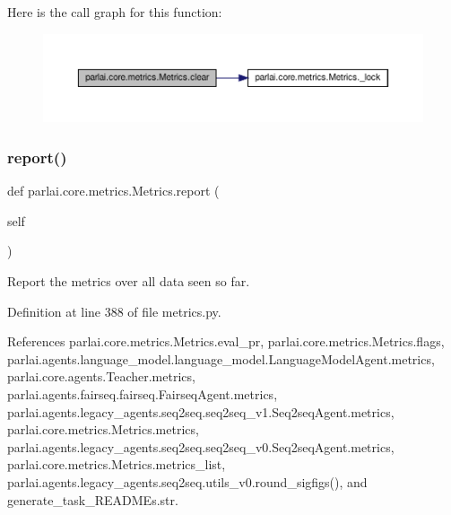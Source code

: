 Here is the call graph for this function\+:
\nopagebreak
\begin{figure}[H]
\begin{center}
\leavevmode
\includegraphics[width=350pt]{classparlai_1_1core_1_1metrics_1_1Metrics_a72759455e9d5ebab2775aed1fa7f952a_cgraph}
\end{center}
\end{figure}
\mbox{\label{classparlai_1_1core_1_1metrics_1_1Metrics_ae96ffa8a0a1044cdcfcf6cf15fa139ee}} 
\subsubsection{\texorpdfstring{report()}{report()}}
{\footnotesize\ttfamily def parlai.\+core.\+metrics.\+Metrics.\+report (\begin{DoxyParamCaption}\item[{}]{self }\end{DoxyParamCaption})}

\begin{DoxyVerb}Report the metrics over all data seen so far.\end{DoxyVerb}
 

Definition at line 388 of file metrics.\+py.



References parlai.\+core.\+metrics.\+Metrics.\+eval\+\_\+pr, parlai.\+core.\+metrics.\+Metrics.\+flags, parlai.\+agents.\+language\+\_\+model.\+language\+\_\+model.\+Language\+Model\+Agent.\+metrics, parlai.\+core.\+agents.\+Teacher.\+metrics, parlai.\+agents.\+fairseq.\+fairseq.\+Fairseq\+Agent.\+metrics, parlai.\+agents.\+legacy\+\_\+agents.\+seq2seq.\+seq2seq\+\_\+v1.\+Seq2seq\+Agent.\+metrics, parlai.\+core.\+metrics.\+Metrics.\+metrics, parlai.\+agents.\+legacy\+\_\+agents.\+seq2seq.\+seq2seq\+\_\+v0.\+Seq2seq\+Agent.\+metrics, parlai.\+core.\+metrics.\+Metrics.\+metrics\+\_\+list, parlai.\+agents.\+legacy\+\_\+agents.\+seq2seq.\+utils\+\_\+v0.\+round\+\_\+sigfigs(), and generate\+\_\+task\+\_\+\+R\+E\+A\+D\+M\+Es.\+str.

